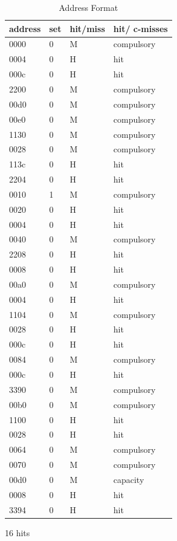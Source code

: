\documentclass{article}
\begin{document}
\begin{table}[H]
	\centering
	\caption{Address Format}
	\label{my-label}
	\begin{tabular}{|l|l|l|l}
		\hline
		address & set & hit/miss & hit/ c-misses\\ \hline
		0000    &   0  &M        & compulsory  \\ \hline
		0004    &   0  &H         & hit  \\ \hline
		000c    &   0  &H         & hit\\ \hline
		2200    &   0  &M       &  compulsory \\ \hline
		00d0    &    0 &M         & compulsory  \\ \hline
		00e0    & 0    &M         &  compulsory \\ \hline
		1130    &  0   &M        & compulsory  \\ \hline
		0028    &   0  &M        &  compulsory \\ \hline
		113c    &  0   &H          &hit \\ \hline
		2204    &  0   &H          &hit \\ \hline
		0010    &   1  &M         & compulsory \\ \hline
		0020    &  0   &H          & hit\\ \hline
		0004    &  0   &H          & hit \\ \hline
		0040    &   0  &M          &  compulsory\\ \hline
		2208    &  0   &H          &  hit\\ \hline
		0008    & 0    &H          &  hit\\ \hline
		00a0    & 0    &M          & compulsory\\ \hline
		0004    & 0    &H          &  hit\\ \hline
		1104    &0     &M          & compulsory\\ \hline
		0028    &  0   &H          & hit \\ \hline
		000c    &   0  &H          & hit \\ \hline
		0084    &  0   &M          & compulsory\\ \hline
		000c    &   0  &H          & hit \\ \hline
		3390    &  0   &M          & compulsory\\ \hline
		00b0    &  0   &M          & compulsory\\ \hline
		1100    &   0  &H          & hit \\ \hline
		0028    &  0   &H          &  hit\\ \hline
		0064    &  0   &M          & compulsory\\ \hline
		0070    &  0   &M          & compulsory\\ \hline
		00d0    &  0   &M          & capacity\\ \hline
		0008    &   0  &  H        &  hit\\ \hline
		3394    &  0   & H         &  hit\\ \hline
	\end{tabular}
\end{table}
16 hits
\end{document}
